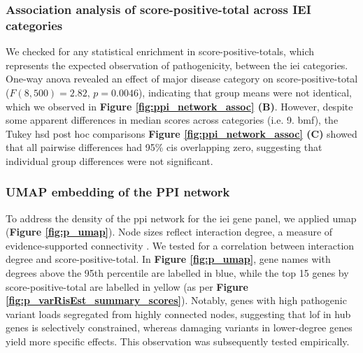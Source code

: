 \FloatBarrier
\subsubsection{Association analysis of score-positive-total across IEI categories} 

We checked for any statistical enrichment in score-positive-totals, which represents the expected observation of pathogenicity, between the \ac{iei} categories.
One-way \ac{anova} revealed an effect of major disease category on score-positive-total (\(F(8,500)=2.82,\,p=0.0046\)), indicating that group means were not identical, which we observed in
\textbf{Figure \ref{fig:ppi_network_assoc} (B)}.
However, despite some apparent differences in median scores across categories (i.e. 9. \ac{bmf}), the Tukey \ac{hsd} post hoc comparisons 
\textbf{Figure \ref{fig:ppi_network_assoc} (C)}
showed that all pairwise differences had 95\% \ac{ci}s overlapping zero, suggesting that individual group differences were not significant.

\FloatBarrier
\subsubsection{UMAP embedding of the PPI  network}
To address the density of the \ac{ppi} network for the \ac{iei} gene panel, we applied \ac{umap} (\textbf{Figure \ref{fig:p_umap}}). 
Node sizes reflect interaction degree, a measure of evidence-supported connectivity \cite{szklarczyk2025string}. We tested for a correlation between interaction degree and score-positive-total. In \textbf{Figure \ref{fig:p_umap}}, gene names with degrees above the 95th percentile are labelled in blue, while the top 15 genes by score-positive-total are labelled in yellow (as per \textbf{Figure \ref{fig:p_varRisEst_summary_scores}}). Notably, genes with high pathogenic variant loads segregated from highly connected nodes, suggesting that \ac{lof} in hub genes is selectively constrained, whereas damaging variants in lower-degree genes yield more specific effects. 
This observation was subsequently tested empirically.

